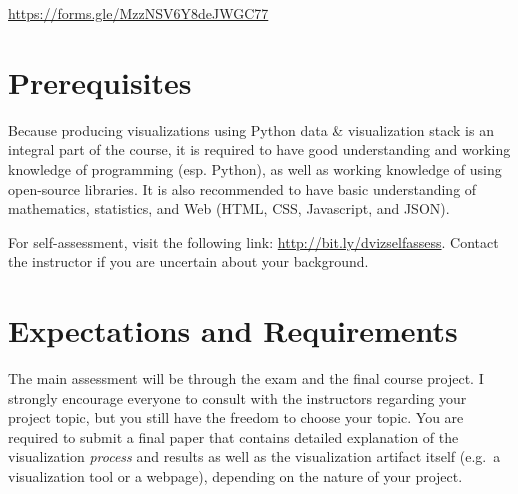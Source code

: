 \documentclass[11pt,article,oneside]{memoir} %
\begin{document}
\url{https://forms.gle/MzzNSV6Y8deJWGC77} 

\section{Prerequisites}%
\label{sec:Prerequisites}

Because producing visualizations using Python data \& visualization stack is an integral part of the course, it is required to have good understanding and working knowledge of programming (esp. Python), as well as working knowledge of using open-source libraries. 
It is also recommended to have basic understanding of mathematics, statistics, and Web (HTML, CSS, Javascript, and JSON). 


For self-assessment, visit the following link: \href{http://bit.ly/dvizselfassess}{http://bit.ly/dvizselfassess}. 
Contact the instructor if you are uncertain about your background. 

\section{Expectations and Requirements}%
\label{sec:requirements}

The main assessment will be through the exam and the final course project. 
I strongly encourage everyone to consult with the instructors regarding your project topic, but you still have the freedom to choose your topic.
You are required to submit a final paper that contains detailed explanation of the visualization \emph{process} and results as well as the visualization artifact itself (e.g.~a visualization tool or a webpage), depending on the nature of your project. 
\end{document}
